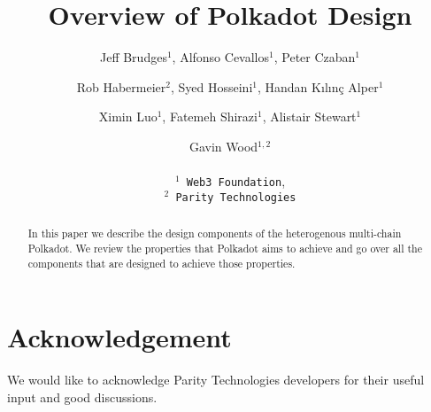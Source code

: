 \documentclass{article}
\title{Overview of Polkadot Design}
\author{
  Jeff Brudges$^1$, Alfonso Cevallos$^1$, Peter Czaban$^1$\\
  \and
  Rob Habermeier$^2$, Syed Hosseini$^1$, Handan K{\i}l{\i}n\c{c} Alper$^1$\\
  \and
  Ximin Luo$^1$, Fatemeh Shirazi$^1$, Alistair Stewart$^1$\\
  \and
  Gavin Wood$^{1,2}$\\
  \\
  \texttt{$^1$ Web3 Foundation},\\
  \texttt{$^2$ Parity Technologies}
}
\begin{document}
\maketitle

\begin{abstract}
	In this paper we describe the design components of the heterogenous multi-chain Polkadot.
We review the properties that Polkadot aims to achieve and go over all the components that are designed to achieve those properties.

\end{abstract}

\tableofcontents
\newpage




%

\section*{Acknowledgement}
We would like to acknowledge Parity Technologies developers for their useful input and good discussions.


\begin{appendix}

\end{appendix}
\end{document}
